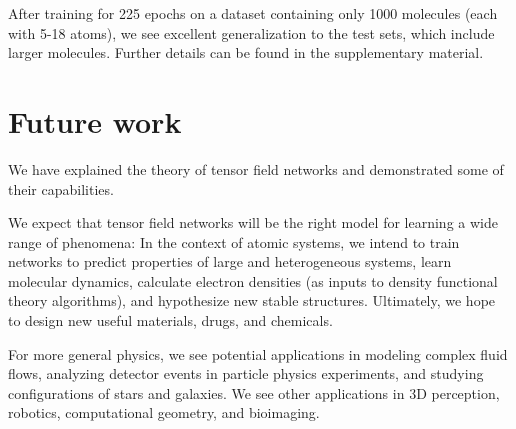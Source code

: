 \documentclass{article}
\begin{document}
After training for 225 epochs on a dataset containing only 1000 molecules (each with 5-18 atoms), we see excellent generalization to the test sets, which include larger molecules. Further details can be found in the supplementary material.


\section{Future work}\label{sec:future}

We have explained the theory of tensor field networks and demonstrated some of their capabilities.

We expect that tensor field networks will be the right model for learning a wide range of phenomena:  In the context of atomic systems, we intend to train networks to predict properties of large and heterogeneous systems, learn molecular dynamics, calculate electron densities (as inputs to density functional theory algorithms), and hypothesize new stable structures.  Ultimately, we hope to design new useful materials, drugs, and chemicals.

For more general physics, we see potential applications in modeling complex fluid flows, analyzing detector events in particle physics experiments, and studying configurations of stars and galaxies.  We see other applications in 3D perception, robotics, computational geometry, and bioimaging.

\end{document}

